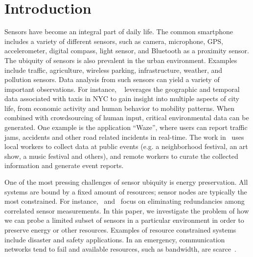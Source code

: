 \documentclass{acm_proc_article-sp}
\begin{document}
\section{Introduction}
Sensors have become an integral part of daily life. The common smartphone includes a variety of different sensors, such as camera, microphone, GPS, accelerometer, digital compass, light sensor, and Bluetooth as a proximity sensor. The ubiquity of sensors is also prevalent in the urban environment. Examples include traffic, agriculture, wireless parking, infrastructure, weather, and pollution sensors. Data analysis from such sensors can yield a variety of important observations. For instance, ~\cite{ferreira2013visual} leverages the geographic and temporal data associated with taxis in NYC to gain insight into multiple aspects of city life, from economic activity and human behavior to mobility patterns. When combined with crowdsourcing of human input, critical environmental data can be generated. One example is the application ``Waze'', where users can report traffic jams, accidents and other road related incidents in real-time. The work in~\cite{agapie2015crowdsourcing} uses local workers to collect data at public events (e.g. a neighborhood festival, an art show, a music festival and others), and remote workers to curate the collected information and generate event reports.\par

One of the most pressing challenges of sensor ubiquity is energy preservation. All systems are bound by a fixed amount of resources; sensor nodes are typically the most constrained. For instance,~\cite{marco2003many} and~\cite{pattem2008impact} focus on eliminating redundancies among correlated sensor measurements. In this paper, we investigate the problem of how we can probe a limited subset of sensors in a particular environment in order to preserve energy or other resources. Examples of resource constrained systems include disaster and safety applications. In an emergency, communication networks tend to fail and available resources, such as bandwidth, are scarce~\cite{manoj2007communication}.\par
\end{document}
